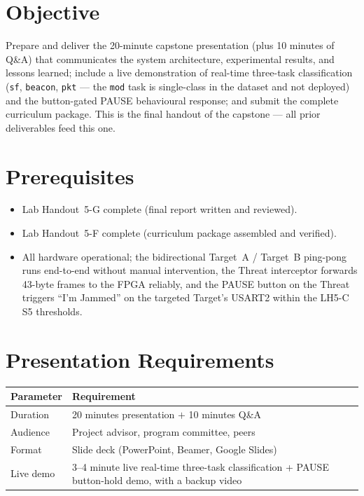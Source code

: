\documentclass[11pt,letterpaper]{article}
\begin{document}

\section{Objective}
Prepare and deliver the 20-minute capstone presentation (plus 10 minutes of Q\&A) that communicates the system architecture, experimental results, and lessons learned; include a live demonstration of real-time three-task classification (\texttt{sf}, \texttt{beacon}, \texttt{pkt} --- the \texttt{mod} task is single-class in the dataset and not deployed) and the button-gated PAUSE behavioural response; and submit the complete curriculum package. This is the final handout of the capstone --- all prior deliverables feed this one.

\section{Prerequisites}
\begin{itemize}[leftmargin=2em]
	\item Lab Handout~5-G complete (final report written and reviewed).
	\item Lab Handout~5-F complete (curriculum package assembled and verified).
	\item All hardware operational; the bidirectional Target~A / Target~B ping-pong runs end-to-end without manual intervention, the Threat interceptor forwards 43-byte frames to the FPGA reliably, and the PAUSE button on the Threat triggers ``I'm Jammed'' on the targeted Target's USART2 within the LH5-C S5 thresholds.
\end{itemize}

\section{Presentation Requirements}

\begin{table}[h!]
	\centering
	\renewcommand{\arraystretch}{1.3}
	\begin{tabularx}{\textwidth}{l X}
		\toprule
		\textbf{Parameter} & \textbf{Requirement} \\
		\midrule
		Duration   & 20 minutes presentation $+$ 10 minutes \mbox{Q\&A} \\
		Audience   & Project advisor, program committee, peers \\
		Format     & Slide deck (PowerPoint, Beamer, Google Slides) \\
		Live demo  & 3--4 minute live real-time three-task classification + PAUSE button-hold demo, with a backup video \\
		\bottomrule
	\end{tabularx}
\end{table}
\end{document}
